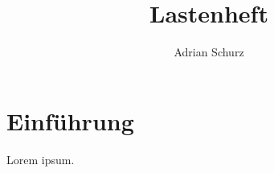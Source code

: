 \documentclass[11pt]{article}
\author{Adrian Schurz}
\title{Lastenheft}
\begin{document}
\maketitle
{}
\newpage
{}
\section{Einführung}
Lorem ipsum.
\end{document}
